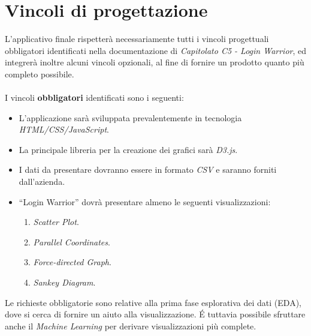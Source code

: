 \section{Vincoli di progettazione}

L'applicativo finale rispetterà necessariamente tutti i vincoli progettuali obbligatori identificati nella documentazione di \textit{Capitolato C5 - Login Warrior}, ed integrerà inoltre alcuni vincoli opzionali, al fine di fornire un prodotto quanto più completo possibile. \\ \\
I vincoli \textbf{obbligatori} identificati sono i seguenti:
\begin{itemize}
	\item L’applicazione sarà sviluppata prevalentemente in tecnologia \textit{HTML/CSS/JavaScript}.
	\item La principale libreria per la creazione dei grafici sarà \textit{D3.js}.
	\item I dati da presentare dovranno essere in formato \textit{CSV} e saranno forniti 
			dall'azienda.
	\item “Login Warrior” dovrà presentare almeno le seguenti visualizzazioni:
		 \begin{enumerate}
                    \item \textit{Scatter Plot}.
                    \item \textit{Parallel Coordinates}.
                    \item \textit{Force-directed Graph}.
                    \item \textit{Sankey Diagram}.
		\end{enumerate}
\end{itemize}

\noindent
Le richieste obbligatorie sono relative alla prima fase esplorativa dei dati (EDA), dove si cerca di fornire un aiuto alla visualizzazione. \' E tuttavia possibile sfruttare anche il \textit{Machine Learning} per derivare visualizzazioni più complete.

